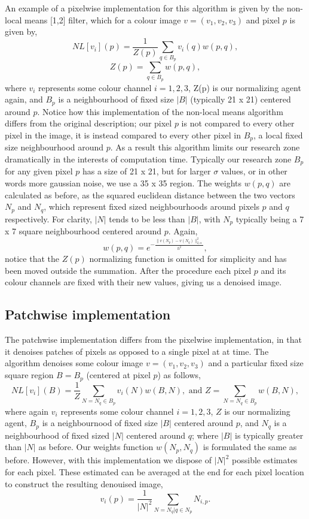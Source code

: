 \documentclass[fullpage]{article}
\begin{document}
An example of a pixelwise implementation for this algorithm is given by the non-local means [1,2] filter, which for a colour image $v = (v_1,v_2,v_3)$ and pixel $p$ is given by,
$$NL[v_i](p) = \frac{1}{Z(p)} \sum_{q \in B_{p}} v_i(q)w(p,q),$$
$$Z(p) = \sum_{q \in B_{p}}w(p,q),$$
where $v_i$ represents some colour channel $i = 1, 2, 3$, Z(p) is our normalizing agent again, and $B_p$ is a neighbourhood of fixed size $|B|$ (typically 21 x 21) centered around $p$. Notice how this implementation of the non-local means algorithm differs from the original description; our pixel $p$ is not compared to every other pixel in the image, it is instead compared to every other pixel in $B_p$, a local fixed size neighbourhood around $p$. As a result this algorithm limits our research zone dramatically in the interests of computation time. Typically our research zone $B_p$ for any given pixel $p$ has a size of 21 x 21, but for larger $\sigma$ values, or in other words more gaussian noise, we use a 35 x 35 region. The weights $w(p,q)$ are calculated as before, as the squared euclidean distance between the two vectors $N_p$ and $N_q$, which represent fixed sized neighbourhoods around pixels $p$ and $q$ respectively. For clarity, $|N|$ tends to be less than $|B|$, with $N_p$ typically being a 7 x 7 square neighbourhood centered around $p$. Again,
$$w(p,q) =  e^{-\frac{\parallel v(N_{p}) - v(N_{q}) \parallel_{2, \alpha}^{2}}{h^2}},$$
notice that the $Z(p)$ normalizing function is omitted for simplicity and has been moved outside the summation. After the procedure each pixel $p$ and its colour channels are fixed with their new values, giving us a denoised image.
\subsection{Patchwise implementation}
The patchwise implementation differs from the pixelwise implementation, in that it denoises patches of pixels as opposed to a single pixel at at time. The algorithm denoises some colour image $v = (v_1, v_2, v_3)$ and a particular fixed size square region $B = B_p$ (centered at pixel $p$) as follows,
$$NL[v_i](B) = \frac{1}{Z} \sum_{N = N_q \in B_p} v_i(N)w(B, N), \text{ and } Z = \sum_{N = N_q \in B_p} w(B, N), $$
where again $v_i$ represents some colour channel $i = 1, 2, 3$, $Z$ is our normalizing agent, $B_p$ is a neighbournood of fixed size $|B|$ centered around $p$, and $N_q$ is a neighbourhood of fixed sized $|N|$ centered around $q$; where $|B|$ is typically greater than $|N|$ as before. Our weights function $w(N_p, N_q)$ is formulated the same as before. However, with this implementation we dispose of $|N|^2$ possible estimates for each pixel. These estimated can be averaged at the end for each pixel location to construct the resulting denouised image,
$$v_i(p) = \frac{1}{|N|^2} \sum_{N=N_q | q \in N_p}N_{i,p}.$$
\end{document}

